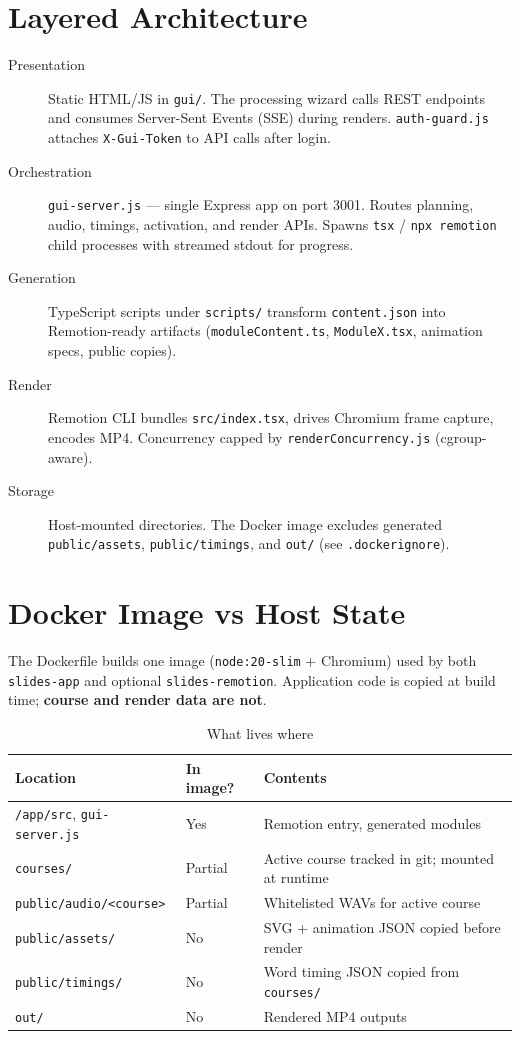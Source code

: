 \documentclass{scinexus}
\newcommand{\tableheadrow}[1]{\sffamily\bfseries\color{rbnavy} #1}
\begin{document}
\section{Layered Architecture}

\diagramSoftwareLayers

\begin{description}
	\item[Presentation] Static HTML/JS in \texttt{gui/}. The processing wizard calls REST endpoints and consumes Server-Sent Events (SSE) during renders. \texttt{auth-guard.js} attaches \texttt{X-Gui-Token} to API calls after login.
	\item[Orchestration] \texttt{gui-server.js} --- single Express app on port 3001. Routes planning, audio, timings, activation, and render APIs. Spawns \texttt{tsx} / \texttt{npx remotion} child processes with streamed stdout for progress.
	\item[Generation] TypeScript scripts under \texttt{scripts/} transform \texttt{content.json} into Remotion-ready artifacts (\texttt{moduleContent.ts}, \texttt{ModuleX.tsx}, animation specs, public copies).
	\item[Render] Remotion CLI bundles \texttt{src/index.tsx}, drives Chromium frame capture, encodes MP4. Concurrency capped by \texttt{renderConcurrency.js} (cgroup-aware).
	\item[Storage] Host-mounted directories. The Docker image excludes generated \texttt{public/assets}, \texttt{public/timings}, and \texttt{out/} (see \texttt{.dockerignore}).
\end{description}

\section{Docker Image vs Host State}

The Dockerfile builds one image (\texttt{node:20-slim} + Chromium) used by both \texttt{slides-app} and optional \texttt{slides-remotion}. Application code is copied at build time; \textbf{course and render data are not}.

\begin{table}[htbp]
	\centering
	\footnotesize
	\caption{What lives where}
	\begin{tabularx}{\textwidth}{@{}l l L@{}}
		\toprule
		\tableheadrow{Location} & \tableheadrow{In image?} & \tableheadrow{Contents} \\
		\midrule
		\texttt{/app/src}, \texttt{gui-server.js} & Yes & Remotion entry, generated modules \\
		\texttt{courses/} & Partial & Active course tracked in git; mounted at runtime \\
		\texttt{public/audio/<course>} & Partial & Whitelisted WAVs for active course \\
		\texttt{public/assets/} & No & SVG + animation JSON copied before render \\
		\texttt{public/timings/} & No & Word timing JSON copied from \texttt{courses/} \\
		\texttt{out/} & No & Rendered MP4 outputs \\
		\bottomrule
	\end{tabularx}
\end{table}
\end{document}

